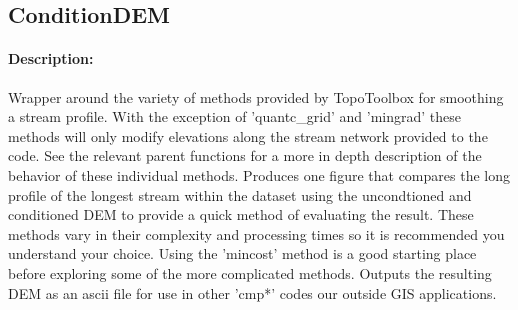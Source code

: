 \subsection{ConditionDEM}

\paragraph{Description:}
Wrapper around the variety of methods provided by TopoToolbox for smoothing a stream profile. With the exception of
'quantc\_grid' and 'mingrad' these methods will only modify elevations along the stream network provided to the code.
See the relevant parent functions for a more in depth description of the behavior of these individual methods. Produces
one figure that compares the long profile of the longest stream within the dataset using the uncondtioned and 
conditioned DEM to provide a quick method of evaluating the result. These methods vary in their complexity and processing
times so it is recommended you understand your choice. Using the 'mincost' method is a good starting place before
exploring some of the more complicated methods. Outputs the resulting DEM as an ascii file for use in other 'cmp*' codes
our outside GIS applications.

